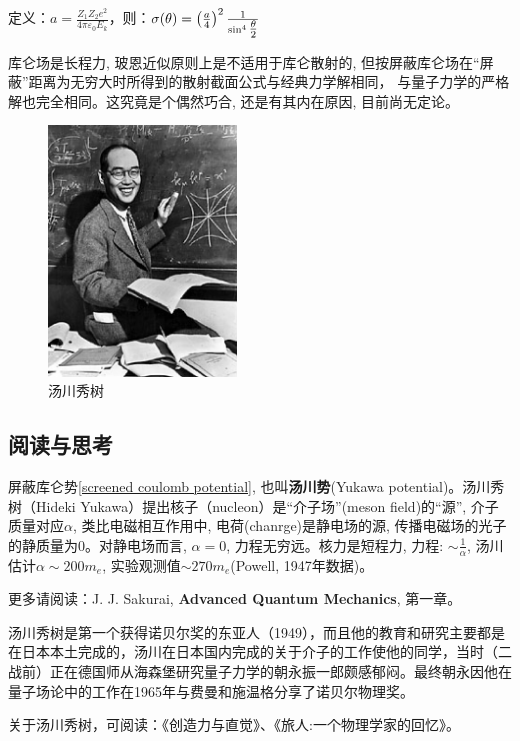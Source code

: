定义：$a = \frac{{Z_1 Z_2 e^2 }}{{4\pi \varepsilon _0 E_k }}$，则：$\sigma (\theta ) = \left( {\frac{a}{4}} \right)^2 \frac{1}{{\sin ^4 {\textstyle{\theta  \over 2}}}}$


库仑场是长程力, 玻恩近似原则上是不适用于库仑散射的,
但按屏蔽库仑场在``屏蔽''距离为无穷大时所得到的散射截面公式与经典力学解相同，
与量子力学的严格解也完全相同。这究竟是个偶然巧合, 还是有其内在原因,
目前尚无定论。


\begin{figure}[h]
\begin{center}
\includegraphics[clip,width=5cm]{Scattering/yukawa.ps}
\caption{汤川秀树}
\end{center}
\end{figure}



\subsection*{阅读与思考}



屏蔽库仑势\ref{screened coulomb potential},
也叫\textbf{汤川势}(Yukawa potential)。汤川秀树（Hideki
Yukawa）提出核子（nucleon）是``介子场''(meson field)的``源'',
介子质量对应$\alpha$, 类比电磁相互作用中, 电荷(chanrge)是静电场的源,
传播电磁场的光子的静质量为$0$。对静电场而言, $\alpha = 0$,
力程无穷远。核力是短程力, 力程: $\sim \frac{1}{\alpha}$,
汤川估计$\alpha \sim 200 m_e$, 实验观测值$\sim 270 m_e$(Powell,
1947年数据)。



更多请阅读：J. J. Sakurai, \textbf{Advanced Quantum Mechanics},
第一章。

汤川秀树是第一个获得诺贝尔奖的东亚人（1949），而且他的教育和研究主要都是在日本本土完成的，汤川在日本国内完成的关于介子的工作使他的同学，当时（二战前）正在德国师从海森堡研究量子力学的朝永振一郎颇感郁闷。最终朝永因他在量子场论中的工作在1965年与费曼和施温格分享了诺贝尔物理奖。

关于汤川秀树，可阅读：《创造力与直觉》、《旅人:一个物理学家的回忆》。







